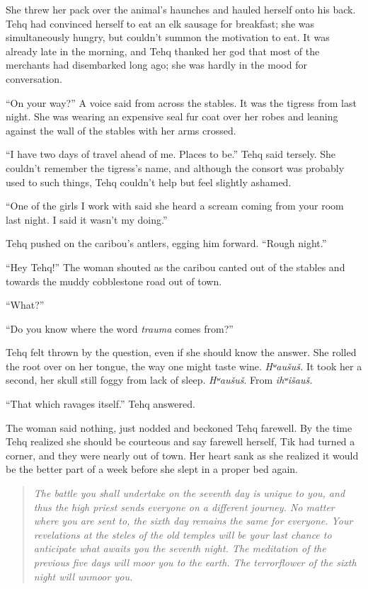 She threw her pack over the animal's haunches and hauled herself onto his back. Tehq had convinced herself to eat an elk sausage for breakfast; she was simultaneously hungry, but couldn't summon the motivation to eat. It was already late in the morning, and Tehq thanked her god that most of the merchants had disembarked long ago; she was hardly in the mood for conversation.

``On your way?'' A voice said from across the stables. It was the tigress from last night. She was wearing an expensive seal fur coat over her robes and leaning against the wall of the stables with her arms crossed.

``I have two days of travel ahead of me. Places to be.'' Tehq said tersely. She couldn't remember the tigress's name, and although the consort was probably used to such things, Tehq couldn't help but feel slightly ashamed.

``One of the girls I work with said she heard a scream coming from your room last night. I said it wasn't my doing.''

Tehq pushed on the caribou's antlers, egging him forward. ``Rough night.''

``Hey Tehq!'' The woman shouted as the caribou canted out of the stables and towards the muddy cobblestone road out of town.

``What?''

``Do you know where the word \emph{trauma} comes from?''

Tehq felt thrown by the question, even if she should know the answer. She rolled the root over on her tongue, the way one might taste wine. \emph{Hʷaušuš.} It took her a second, her skull still foggy from lack of sleep. \emph{Hʷaušuš}. From \emph{ihʷišauš.}

``That which ravages itself.'' Tehq answered.

The woman said nothing, just nodded and beckoned Tehq farewell. By the time Tehq realized she should be courteous and say farewell herself, Tik had turned a corner, and they were nearly out of town. Her heart sank as she realized it would be the better part of a week before she slept in a proper bed again.

\begin{quote}
\emph{The battle you shall undertake on the seventh day is unique to you, and thus the high priest sends everyone on a different journey. No matter where you are sent to, the sixth day remains the same for everyone. Your revelations at the steles of the old temples will be your last chance to anticipate what awaits you the seventh night. The meditation of the previous five days will moor you to the earth. The terrorflower of the sixth night will unmoor you.}
\end{quote}


